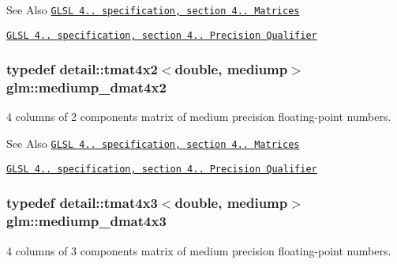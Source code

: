 \begin{DoxySeeAlso}{See Also}
\href{http://www.opengl.org/registry/doc/GLSLangSpec.4.20.8.pdf}{\tt G\-L\-S\-L 4.. specification, section 4.. Matrices} 

\href{http://www.opengl.org/registry/doc/GLSLangSpec.4.20.8.pdf}{\tt G\-L\-S\-L 4.. specification, section 4.. Precision Qualifier} 
\end{DoxySeeAlso}
\hypertarget{group__core__precision_ga03056b616496470371473cd5df4dc1f8}{
\subsubsection[{mediump\-\_\-dmat4x2}]{\setlength{\rightskip}{0pt plus 5cm}typedef detail\-::tmat4x2$<$double, mediump$>$ {\bf glm\-::mediump\-\_\-dmat4x2}}}\label{group__core__precision_ga03056b616496470371473cd5df4dc1f8}
4 columns of 2 components matrix of medium precision floating-\/point numbers.

\begin{DoxySeeAlso}{See Also}
\href{http://www.opengl.org/registry/doc/GLSLangSpec.4.20.8.pdf}{\tt G\-L\-S\-L 4.. specification, section 4.. Matrices} 

\href{http://www.opengl.org/registry/doc/GLSLangSpec.4.20.8.pdf}{\tt G\-L\-S\-L 4.. specification, section 4.. Precision Qualifier} 
\end{DoxySeeAlso}
\hypertarget{group__core__precision_gafa1ba33d2748737129cde471fedbf9c5}{
\subsubsection[{mediump\-\_\-dmat4x3}]{\setlength{\rightskip}{0pt plus 5cm}typedef detail\-::tmat4x3$<$double, mediump$>$ {\bf glm\-::mediump\-\_\-dmat4x3}}}\label{group__core__precision_gafa1ba33d2748737129cde471fedbf9c5}
4 columns of 3 components matrix of medium precision floating-\/point numbers.

